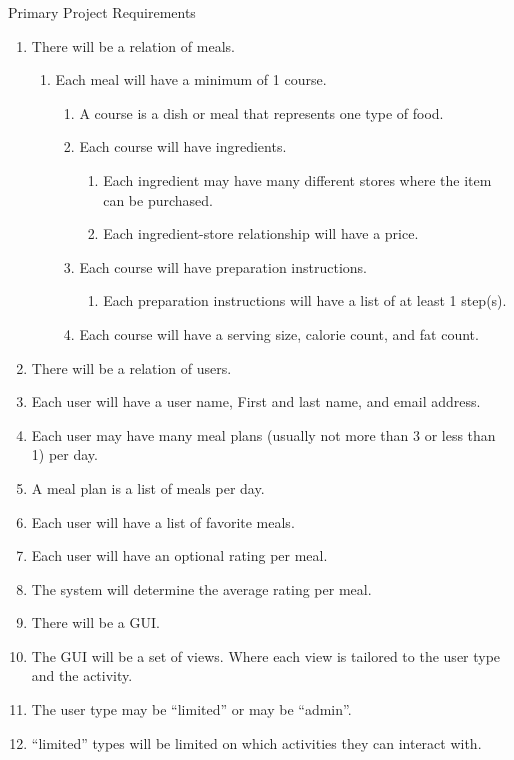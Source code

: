 \documentclass[a4paper,10pt]{article}
\begin{document}
\begin{mySubsection}{Primary Project Requirements}
\begin{enumerate}
\item
There will be a relation of meals.
\begin{enumerate}
\item
Each meal will have a minimum of 1 course.
\begin{enumerate}
\item
A course is a dish or meal that represents one type of food.
\item
Each course will have ingredients.
\begin{enumerate}
\item
Each ingredient may have many different stores where the item can be purchased.
\item
Each ingredient-store relationship will have a price.
\end{enumerate}
\item
Each course will have preparation instructions.
\begin{enumerate}
\item
Each preparation instructions will have a list of at least 1 step(s).
\end{enumerate}
\item
Each course will have a serving size, calorie count, and fat count.
\end{enumerate}
\end{enumerate}
\item
There will be a relation of users.
\item
Each user will have a user name, First and last name, and email address.
\item
Each user may have many meal plans (usually not more than 3 or less than 1) per day.
\item
A meal plan is a list of meals per day.
\item
Each user will have a list of favorite meals.
\item
Each user will have an optional rating per meal.
\item
The system will determine the average rating per meal.
\item
There will be a GUI.
\item
The GUI will be a set of views. Where each view is tailored to the user type and the activity.
\item
The user type may be “limited” or may be “admin”.
\item
“limited” types will be limited on which activities they can interact with.

\end{enumerate}
\end{mySubsection}
\end{document}
